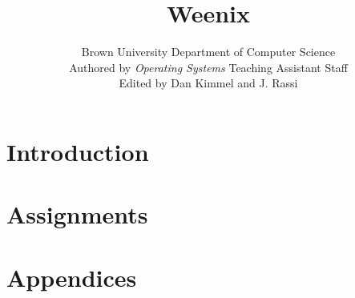 \documentclass{book}
\title{\bf Weenix}
\author{Brown University Department of Computer Science \\ Authored by \textit{Operating Systems} Teaching Assistant Staff \\ Edited by Dan Kimmel and J. Rassi}
\begin{document}
    \maketitle
    \tableofcontents
	\part{Introduction}
        
        
    \part{Assignments}
        
        
        
        
        
    \part{Appendices}
        \appendix
        
        
        
\end{document}
